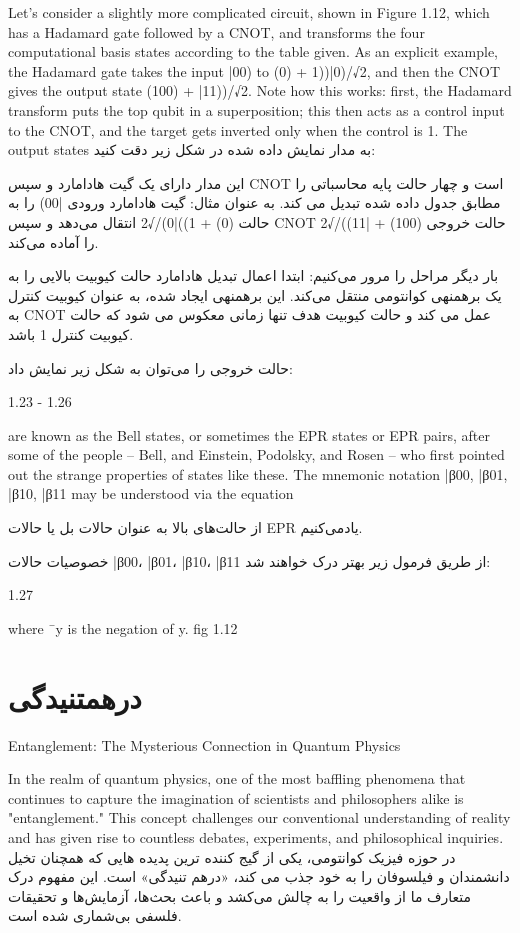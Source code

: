 \documentclass{book}
\begin{document}
Let's consider a slightly more complicated circuit, shown in Figure 1.12, which has a Hadamard gate followed by a CNOT, and transforms the four computational basis states according to the table given. As an explicit example, the Hadamard gate takes the input |00) to (0) + 1))|0)/√2, and then the CNOT gives the output state (100) + |11))/√2. Note how this works: first, the Hadamard transform puts the top qubit in a superposition; this then acts as a control input to the CNOT, and the target gets inverted only when the control is 1. The output states
به مدار نمایش داده شده در شکل زیر دقت کنید:

این مدار دارای یک گیت هادامارد و سپس CNOT است و چهار حالت پایه محاسباتی را مطابق جدول داده شده تبدیل می کند. به عنوان مثال:
 گیت هادامارد ورودی |00) را به حالت (0) + 1))|0)/√2 انتقال می‌دهد و سپس CNOT حالت خروجی (100) + |11))/√2 را آماده می‌کند. 
 
 بار دیگر مراحل را مرور می‌کنیم:
  ابتدا اعمال تبدیل هادامارد حالت کیوبیت بالایی را به یک برهمنهی کوانتومی منتقل می‌کند. این برهمنهی ایجاد شده،‌ به عنوان کیوبیت کنترل به CNOT عمل می کند و حالت کیوبیت هدف تنها زمانی معکوس می شود که حالت کیوبیت کنترل 1 باشد.
  
  
حالت خروجی را می‌توان به شکل زیر نمایش داد:


1.23 - 1.26


are known as the Bell states, or sometimes the EPR states or EPR pairs, after some of
the people – Bell, and Einstein, Podolsky, and Rosen – who first pointed out the strange
properties of states like these. The mnemonic notation |β00, |β01, |β10, |β11 may be understood via the equation
 
 از حالت‌های بالا به عنوان حالات بل یا حالات EPR یاد‌می‌کنیم.
  
  
خصوصیات حالات |β00، |β01، |β10، |β11 از طریق فرمول زیر بهتر درک خواهند شد:

 
 1.27
 
 where ¯y is the negation of y.
 fig 1.12

\newpage






\section{درهمتنیدگی}

Entanglement: The Mysterious Connection in Quantum Physics

In the realm of quantum physics, one of the most baffling phenomena that continues to capture the imagination of scientists and philosophers alike is "entanglement." This concept challenges our conventional understanding of reality and has given rise to countless debates, experiments, and philosophical inquiries.\\
در حوزه فیزیک کوانتومی، یکی از گیج کننده ترین پدیده هایی که همچنان تخیل دانشمندان و فیلسوفان را به خود جذب می کند، «درهم تنیدگی» است. این مفهوم درک متعارف ما از واقعیت را به چالش می‌کشد و باعث بحث‌ها، آزمایش‌ها و تحقیقات فلسفی بی‌شماری شده است.\\
\end{document}
